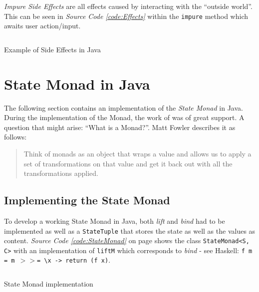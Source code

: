 \documentclass[a4paper,12pt,twoside]{scrreprt}
\begin{document}
\textit{Impure Side Effects} are all effects caused by interacting with the \enquote{outside world}. This can be seen in \textit{Source Code \ref{code:Effects}} within the \texttt{impure} method which awaits user action/input.

\begin{listing}[ht]
    \inputminted[fontsize=\footnotesize,linenos,breaklines,breakanywhere]{java}{./code/SideEffects.java}
    \caption[Example of Side Effects in Java]{Example of Side Effects in Java}
    \label{code:Effects}
\end{listing}

\clearpage

\section{State Monad in Java}
The following section contains an implementation of the \textit{State Monad} in Java. During the implementation of the Monad, the work of \cite{muzietto_state_2014} was of great support. A question that might arise: \enquote{What is a Monad?}. Matt Fowler describes it as follows: 
\begin{quote}
    Think of monads as an object that wraps a value and allows us to apply a set of transformations on that value and get it back out with all the transformations applied. \cite{fowler_understanding_2015}
\end{quote}

\subsection{Implementing the State Monad}
To develop a working State Monad in Java, both \textit{lift} and \textit{bind} had to be implemented as well as a \texttt{StateTuple} that stores the state as well as the values as content. \textit{Source Code \ref{code:StateMonad}} on page \pageref{code:StateMonad} shows the class \texttt{StateMonad<S, C>} with an implementation of \texttt{liftM} which corresponds to \textit{bind} - see Haskell: \texttt{f m = m $>$$>$= \textbackslash x -> return (f x)}.

\begin{listing}[ht]
    \inputminted[fontsize=\footnotesize,linenos,breaklines,breakanywhere]{java}{./code/statemonad/StateMonad.java}
    \caption[State Monad implementation]{State Monad implementation}
    \label{code:StateMonad}
\end{listing}

\clearpage
\end{document}
